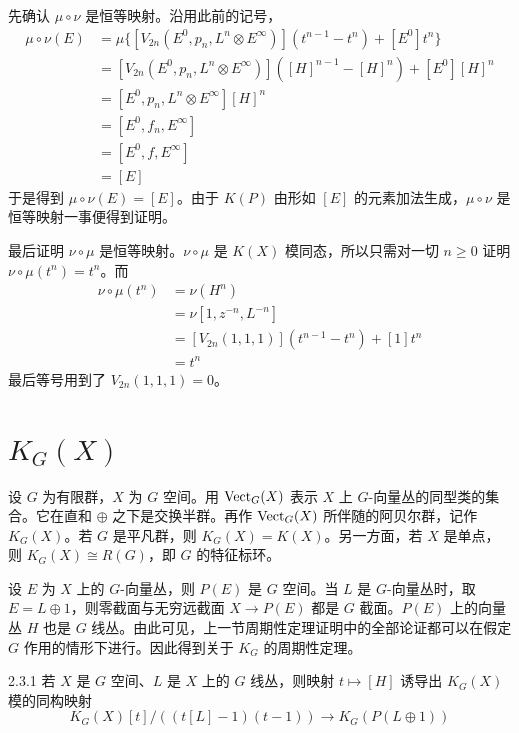先确认 $\mu\circ\nu$ 是恒等映射。沿用此前的记号，
\[
\begin{aligned}
\mu\circ\nu(E)&=\mu\{[V_{2n}(E^0,p_n,L^n\otimes E^\infty)](t^{n-1}-t^n)+[E^0]t^n\}\\
&=[V_{2n}(E^0,p_n,L^n\otimes E^\infty)]([H]^{n-1}-[H]^n)+[E^0][H]^n\\
&=[E^0,p_n,L^n\otimes E^\infty][H]^n\\
&=[E^0,f_n,E^\infty]\\
&=[E^0,f,E^\infty]\\
&=[E]
\end{aligned}
\]
于是得到 $\mu\circ\nu(E)=[E]$。由于 $K(P)$ 由形如 $[E]$ 的元素加法生成，$\mu\circ\nu$ 是恒等映射一事便得到证明。

最后证明 $\nu\circ\mu$ 是恒等映射。$\nu\circ\mu$ 是 $K(X)$ 模同态，所以只需对一切 $n\ge0$ 证明 $\nu\circ\mu(t^n)=t^n$。而
\[
\begin{aligned}
\nu\circ\mu(t^n)&=\nu(H^n)\\
&=\nu[1,z^{-n},L^{-n}]\\
&=[V_{2n}(1,1,1)](t^{n-1}-t^n)+[1]t^n\\
&=t^n
\end{aligned}
\]
最后等号用到了 $V_{2n}(1,1,1)=0$。

\section{$K_G(X)$}

设 $G$ 为有限群，$X$ 为 $G$ 空间。用 $\operatorname{Vect}_G(X)$ 表示 $X$ 上 $G$-向量丛的同型类的集合。它在直和 $\oplus$ 之下是交换半群。再作 $\operatorname{Vect}_G(X)$ 所伴随的阿贝尔群，记作 $K_G(X)$。若 $G$ 是平凡群，则 $K_G(X)=K(X)$。另一方面，若 $X$ 是单点，则 $K_G(X)\cong R(G)$，即 $G$ 的特征标环。

设 $E$ 为 $X$ 上的 $G$-向量丛，则 $P(E)$ 是 $G$ 空间。当 $L$ 是 $G$-向量丛时，取 $E=L\oplus1$，则零截面与无穷远截面 $X\to P(E)$ 都是 $G$ 截面。$P(E)$ 上的向量丛 $H$ 也是 $G$ 线丛。由此可见，上一节周期性定理证明中的全部论证都可以在假定 $G$ 作用的情形下进行。因此得到关于 $K_G$ 的周期性定理。

\begin{theorem*}{2.3.1}
  若 $X$ 是 $G$ 空间、$L$ 是 $X$ 上的 $G$ 线丛，则映射 $t\mapsto[H]$ 诱导出 $K_G(X)$ 模的同构映射
  \[
  K_G(X)[t]/((t[L]-1)(t-1))\longrightarrow K_G(P(L\oplus1))
  \]
\end{theorem*}

